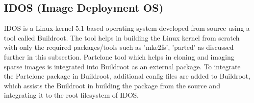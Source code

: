 \documentclass[a4paper,12pt]{article}
\begin{document}
\subsection{ IDOS (Image Deployment OS) }
IDOS is a Linux-kernel 5.1 based operating system developed from source using a tool called  Buildroot\cite{buildroot}. The tool helps in building the Linux kernel from scratch with only the required packages/tools such as 'mke2fs', 'parted' as discussed further in this subsection. Partclone tool which helps in cloning and imaging sparse images is integrated into Buildroot as an external package. To integrate the Partclone package in Buildroot, additional config files are added to Buildroot, which assists the Buildroot in building the package from the source and integrating it to the root filesystem of IDOS.
\end{document}
